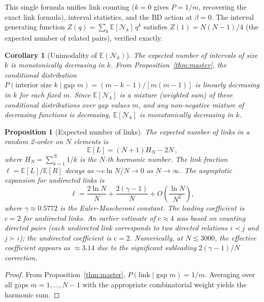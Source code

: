 \documentclass[aps,prd,twocolumn,superscriptaddress,nofootinbib]{revtex4-2}
\newtheorem{proposition}[theorem]{Proposition}
\newtheorem{corollary}[theorem]{Corollary}
\begin{document}
This single formula unifies link counting ($k = 0$ gives $P = 1/m$, recovering the exact link formula), interval statistics, and the BD action at $\beta = 0$. The interval generating function $Z(q) = \sum_k \mathbb{E}[\mathcal{N}_k]\, q^k$ satisfies $Z(1) = N(N-1)/4$ (the expected number of related pairs), verified exactly.

\begin{corollary}[Unimodality of $\mathbb{E}(\mathcal{N}_k)$]
\label{cor:unimodal}
The expected number of intervals of size $k$ is monotonically decreasing in $k$. From Proposition~\ref{thm:master}, the conditional distribution $P(\text{interior size } k \mid \text{gap } m) = (m-k-1)/[m(m-1)]$ is linearly decreasing in $k$ for each fixed $m$. Since $\mathbb{E}[\mathcal{N}_k]$ is a mixture (weighted sum) of these conditional distributions over gap values $m$, and any non-negative mixture of decreasing functions is decreasing, $\mathbb{E}[\mathcal{N}_k]$ is monotonically decreasing in $k$.
\end{corollary}

\begin{proposition}[Expected number of links]
\label{prop:links}
The expected number of links in a random 2-order on $N$ elements is
\begin{equation}
\mathbb{E}[L] = (N+1) H_N - 2N\,,
\end{equation}
where $H_N = \sum_{k=1}^N 1/k$ is the $N$-th harmonic number. The link fraction $\ell = \mathbb{E}[L] / \mathbb{E}[R]$ decays as $\sim c \ln N / N \to 0$ as $N \to \infty$. The asymptotic expansion for \emph{undirected} links is
\begin{equation}
\ell = \frac{2 \ln N}{N} + \frac{2(\gamma - 1)}{N} + O\!\left(\frac{\ln N}{N^2}\right),
\end{equation}
where $\gamma \approx 0.5772$ is the Euler-Mascheroni constant. The leading coefficient is $c = 2$ for undirected links. An earlier estimate of $c \approx 4$ was based on counting \emph{directed} pairs (each undirected link corresponds to two directed relations $i \prec j$ and $j \succ i$); the undirected coefficient is $c = 2$. Numerically, at $N \lesssim 3000$, the effective coefficient appears as $\approx 3.14$ due to the significant subleading $2(\gamma - 1)/N$ correction.
\end{proposition}

\begin{proof}
From Proposition~\ref{thm:master}, $P(\text{link} \mid \text{gap } m) = 1/m$. Averaging over all gaps $m = 1, \ldots, N-1$ with the appropriate combinatorial weight yields the harmonic sum.
\end{proof}
\end{document}
